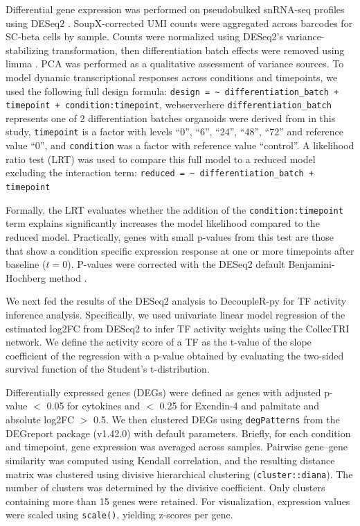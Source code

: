 Differential gene expression was performed on pseudobulked snRNA-seq profiles using DESeq2 \cite{Love2014-rn}. SoupX-corrected UMI counts were aggregated across barcodes for SC-beta cells by sample. Counts were normalized using DESeq2’s variance-stabilizing transformation, then differentiation batch effects were removed using limma \cite{Ritchie2015-ec}. PCA was performed as a qualitative assessment of variance sources. To model dynamic transcriptional responses across conditions and timepoints, we used the following full design formula: \texttt{design = \textasciitilde{} differentiation\_batch + timepoint + condition:timepoint}, webserverhere \texttt{differentiation\_batch} represents one of 2 differentiation batches organoids were derived from in this study, \texttt{timepoint} is a factor with levels ``0'', ``6'', ``24'', ``48'', ``72'' and reference value ``0'', and \texttt{condition} was a factor with reference value ``control''. A likelihood ratio test (LRT) was used to compare this full model to a reduced model excluding the interaction term: \texttt{reduced = \textasciitilde{} differentiation\_batch + timepoint}

Formally, the LRT evaluates whether the addition of the \texttt{condition:timepoint} term explains significantly increases the model likelihood compared to the reduced model. Practically, genes with small p-values from this test are those that show a condition specific expression response at one or more timepoints after baseline (\(t = 0\)). P-values were corrected with the DESeq2 default Benjamini-Hochberg method \cite{Benjamini1995-da}.

We next fed the results of the DESeq2 analysis to DecoupleR-py \cite{Badia-I-Mompel2022-se} for TF activity inference analysis. Specifically, we used univariate linear model regression of the estimated log2FC from DESeq2 to infer TF activity weights using the CollecTRI \cite{Muller-Dott2023-zc} network. We define the activity score of a TF as the t-value of the slope coefficient of the regression with a p-value obtained by evaluating the two-sided survival function of the Student’s t-distribution.

Differentially expressed genes (DEGs) were defined as genes with adjusted p-value $<$ 0.05 for cytokines and $<$ 0.25 for Exendin-4 and palmitate and absolute log2FC $>$ 0.5. We then clustered DEGs using \texttt{degPatterns} from the DEGreport package (v1.42.0) with default parameters. Briefly, for each condition and timepoint, gene expression was averaged across samples. Pairwise gene–gene similarity was computed using Kendall correlation, and the resulting distance matrix was clustered using divisive hierarchical clustering (\texttt{cluster::diana}). The number of clusters was determined by the divisive coefficient. Only clusters containing more than 15 genes were retained. For visualization, expression values were scaled using \texttt{scale()}, yielding z-scores per gene.

